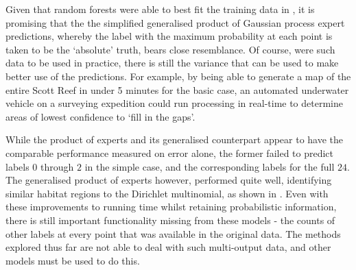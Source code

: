 Given that random forests were able to best fit the training data in , it is promising that the the simplified generalised product of Gaussian process expert predictions, whereby the label with the maximum probability at each point is taken to be the `absolute' truth, bears close resemblance. Of course, were such data to be used in practice, there is still the variance that can be used to make better use of the predictions. For example, by being able to generate a map of the entire Scott Reef in under 5 minutes for the basic case, an automated underwater vehicle on a surveying expedition could run processing in real-time to determine areas of lowest confidence to `fill in the gaps'.

While the product of experts and its generalised counterpart appear to have the comparable performance measured on error alone, the former failed to predict labels $0$ through $2$ in the simple case, and the corresponding labels for the full $24$. The generalised product of experts however, performed quite well, identifying similar habitat regions to the Dirichlet multinomial, as shown in . Even with these improvements to running time whilst retaining probabilistic information, there is still important functionality missing from these models - the counts of other labels at every point that was available in the original data. The methods explored thus far are not able to deal with such multi-output data, and other models must be used to do this.

